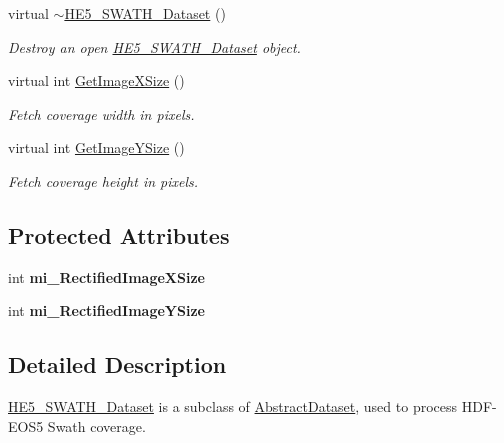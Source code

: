 \begin{DoxyCompactItemize}
virtual \hyperlink{classHE5__SWATH__Dataset_a856d3c221910b12ae765f2e204c3da45}{$\sim$HE5\_\-SWATH\_\-Dataset} ()
\begin{DoxyCompactList}\small\item\em Destroy an open \hyperlink{classHE5__SWATH__Dataset}{HE5\_\-SWATH\_\-Dataset} object. \end{DoxyCompactList}\item 
virtual int \hyperlink{classHE5__SWATH__Dataset_ae942b004815ec68daa146803825d4173}{GetImageXSize} ()
\begin{DoxyCompactList}\small\item\em Fetch coverage width in pixels. \end{DoxyCompactList}\item 
virtual int \hyperlink{classHE5__SWATH__Dataset_a21bc65038425406fc262c9d430a087ee}{GetImageYSize} ()
\begin{DoxyCompactList}\small\item\em Fetch coverage height in pixels. \end{DoxyCompactList}\end{DoxyCompactItemize}
\subsection*{Protected Attributes}
\begin{DoxyCompactItemize}
\item 
\hypertarget{classHE5__SWATH__Dataset_aa36e85f841155a0da9bba0a54f0349f2}{
int {\bfseries mi\_\-RectifiedImageXSize}}
\label{classHE5__SWATH__Dataset_aa36e85f841155a0da9bba0a54f0349f2}

\item 
\hypertarget{classHE5__SWATH__Dataset_a6126339d82bd638b7b869ad4534a760d}{
int {\bfseries mi\_\-RectifiedImageYSize}}
\label{classHE5__SWATH__Dataset_a6126339d82bd638b7b869ad4534a760d}

\end{DoxyCompactItemize}


\subsection{Detailed Description}
\hyperlink{classHE5__SWATH__Dataset}{HE5\_\-SWATH\_\-Dataset} is a subclass of \hyperlink{classAbstractDataset}{AbstractDataset}, used to process HDF-\/EOS5 Swath coverage. 

